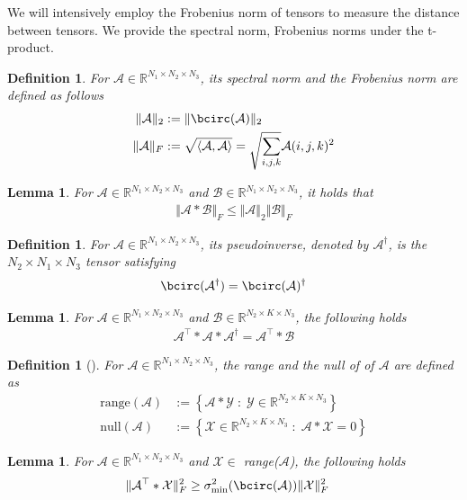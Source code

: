 \documentclass[11pt]{article}
\newtheorem{definition}[theorem]{Definition}
\newtheorem{lemma}[theorem]{Lemma}
\def\fm#1{\mathcal{#1}}
\def\r{\mathbb{R}}
\begin{document}
We will intensively employ the Frobenius norm of tensors to measure the distance between tensors. We  provide the spectral norm, Frobenius norms under the t-product.
\begin{definition}  For $\fm A \in \r^{N_1 \times N_2 \times N_3}$, its spectral norm and the Frobenius norm are defined as follows
\begin{align}
    \Vert \fm A \Vert_2 &  := \Vert \bcirc (\fm A ) \Vert_2\\
    \Vert \fm A \Vert_F &:= \sqrt{\langle \fm A , \fm A \rangle} = \sqrt{\sum_{i,j,k}}\fm A(i,j,k)^2
\end{align}
\end{definition}
\begin{lemma}
    For $\fm A\in \r^{N_1\times N_2 \times N_3}$ and $\fm B\in \r^{N_1\times N_2 \times N_3}$, it holds that 
    \begin{align}
        \Vert \fm A * \fm B \Vert_F\leq \Vert \fm A \Vert_2 \Vert \fm B \Vert_F
    \end{align}
\end{lemma}
\begin{definition} For $\fm A\in \r^{N_1\times N_2\times N_3}$, its pseudoinverse, denoted by $\fm A^\dagger$, is the $N_2\times N_1\times N_3$ tensor satisfying
\begin{align}
    \bcirc(\fm A^\dagger) = \bcirc(\fm A )^\dagger
\end{align}
\end{definition}
\begin{lemma} For $\fm A\in \r^{N_1\times N_2\times N_3}$ and  $\fm B\in \r^{N_2\times K\times N_3}$, the following holds
\begin{align}
\fm A^\top * \fm A * \fm A^\dagger = \fm A^\top * \fm B
\end{align}
\end{lemma}
\begin{definition}[\cite{an2024randomized}] For $\fm A\in \r^{N_1\times N_2\times N_3}$, the range  and the null of of $\fm A$ are defined as 
\begin{align*}
    \text{range}(\fm A ) &:= \left\{\fm A * \fm Y\; :\; \fm Y\in \r^{N_2\times K\times N_3} \right\}\\
    \text{null}(\fm A) &:= \left\{ \fm X \in \r^{N_2\times K \times N_3 }\;:\; \fm A * \fm X = 0    \right\}
\end{align*}
\end{definition}
\begin{lemma}
For $\fm A\in \r^{N_1\times N_2\times N_3}$ and $\fm X\in $ range($\fm A$),  the following holds 
\begin{align}
    \Vert \fm A^\top * \fm X \Vert_F^2 &  \geq \sigma_{\min}^2(\bcirc(\fm A))\Vert \fm X \Vert_F^2
\end{align}
\end{lemma}
\end{document}
